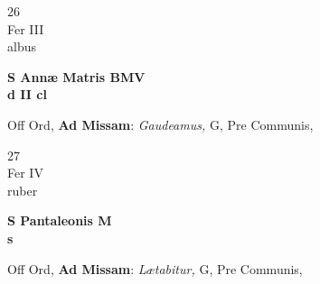 \documentclass[10pt, openany]{book}
\begin{document}
        \begin{center}
            \begin{minipage}{3.5in}
                \vspace{2em}
                \begin{minipage}{0.5in}
                    {\Huge 26} \\
                    {\normalsize Fer III} \\
                    {\normalsize albus}
                \end{minipage}
                \begin{minipage}{3.0in}
                    \textbf{ \large S Annæ Matris BMV \\
                    \textnormal{\normalsize d II cl}} \\ 
                \end{minipage}
                \begin{justify}Off Ord, \textbf{Ad Missam}: \textit{Gaudeamus,} G, Pre Communis,  
                \end{justify}
            \end{minipage}
        \end{center}
    
        \begin{center}
            \begin{minipage}{3.5in}
                \vspace{2em}
                \begin{minipage}{0.5in}
                    {\Huge 27} \\
                    {\normalsize Fer IV} \\
                    {\normalsize ruber}
                \end{minipage}
                \begin{minipage}{3.0in}
                    \textbf{ \large S Pantaleonis M \\
                    \textnormal{\normalsize s}} \\ 
                \end{minipage}
                \begin{justify}Off Ord, \textbf{Ad Missam}: \textit{Lætabitur,} G, Pre Communis,  
                \end{justify}
            \end{minipage}
        \end{center}
    
\end{document}
